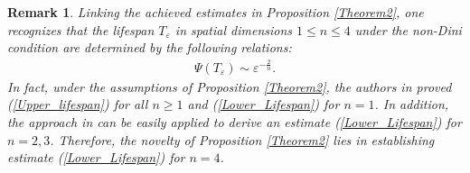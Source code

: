 \documentclass[11pt,reqno]{amsart}
\newtheorem{remark}{Remark}[section]
\begin{document}
\begin{remark}
\selectfont
 Linking the achieved estimates in Proposition \ref{Theorem2}, one recognizes that the lifespan $T_\varepsilon$ in spatial dimensions $1 \leq n \leq 4$ under the non-Dini condition are determined by the following relations:
 \begin{align*}
   \Psi  (T_{\varepsilon}) \sim \varepsilon^{-\frac{2}{n}}.
 \end{align*}
In fact, under the assumptions of Proposition \ref{Theorem2}, the authors in \cite{ChenGirardi2025} proved (\ref{Upper_lifespan}) for all $n \geq 1$ and (\ref{Lower_Lifespan}) for $n=1$. In addition, the approach in \cite{Girardi2024} can be easily applied to derive an estimate (\ref{Lower_Lifespan}) for $n=2,3$. Therefore, the novelty of Proposition \ref{Theorem2} lies in establishing estimate (\ref{Lower_Lifespan}) for $n=4$.

    
\end{remark}
\end{document}
